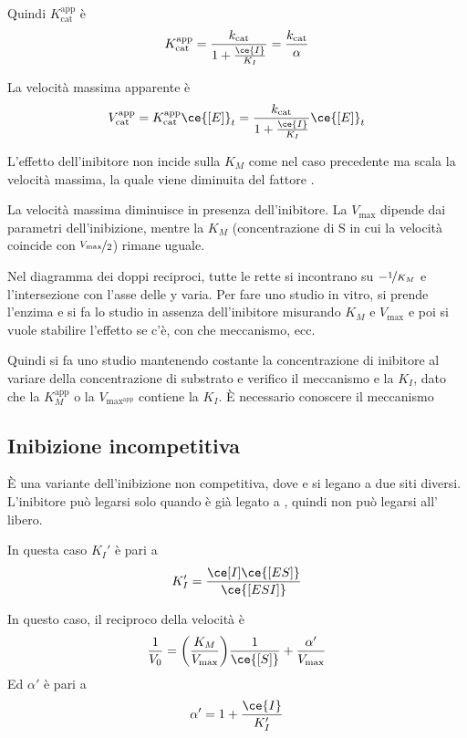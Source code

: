 Quindi $K_{\text{cat}}^{\text{app}}$ è
\[
K_{\text{cat}}^{\text{app}} = \frac{k_{\text{cat}}}{1 + \frac{\ce{I}}{K_I}} =  \frac{k_{\text{cat}}}{\alpha}
\]

La velocità massima apparente è
\[
V_{\text{cat}}^{\text{app}} = K_{\text{cat}}^{\text{app}} \ce{[E]}_t = \frac{k_{\text{cat}}}{1 + \frac{\ce{I}}{K_I}} \ce{[E]}_t
\]

L’effetto dell’inibitore non incide sulla $K_M$ come nel caso precedente ma scala la velocità massima, la quale viene diminuita del fattore \alpha.

La velocità massima diminuisce in presenza dell’inibitore.
La $V_{\text{max}}$ dipende dai parametri dell’inibizione, mentre la $K_M$ (concentrazione
di S in cui la velocità coincide con $\nicefrac{V_{\text{max}}}{2}$) rimane uguale.


Nel diagramma dei doppi reciproci, tutte le rette si incontrano su $-\nicefrac{1}{K_M}$ e l’intersezione con l’asse delle y varia.
Per fare uno studio in vitro, si prende l’enzima e si fa lo studio in assenza dell’inibitore misurando $K_M$ e $V_{\text{max}}$ e poi si vuole stabilire l’effetto se c’è, con che meccanismo, ecc.

Quindi si fa uno studio mantenendo costante la concentrazione di inibitore al variare della
concentrazione di substrato e verifico il meccanismo e la $K_I$, dato che la $K_M^{\text{app}}$ o la $V_{\text{max}^{\text{app}}}$ contiene la $K_I$. È necessario conoscere il meccanismo


\subsection{Inibizione incompetitiva}

È una variante dell'inibizione non competitiva, dove  e  si legano a due siti diversi.
L’inibitore può legarsi solo quando  è già legato a , quindi non può legarsi all’ libero.


In questa caso $K_I'$ è pari a
\[
K_I' = \frac{\ce[I] \ce{[ES]}}{\ce{[ESI]}}
\]

In questo caso, il reciproco della velocità è
\[
\frac{1}{V_0} = \biggl(\frac{K_M}{V_{\text{max}}}\biggr) \frac{1}{\ce{[S]}} + \frac{\alpha'}{V_{\text{max}}}
\]
Ed $\alpha'$ è pari a
\[
\alpha' = 1 + \frac{\ce{I}}{K_I'}
\]

